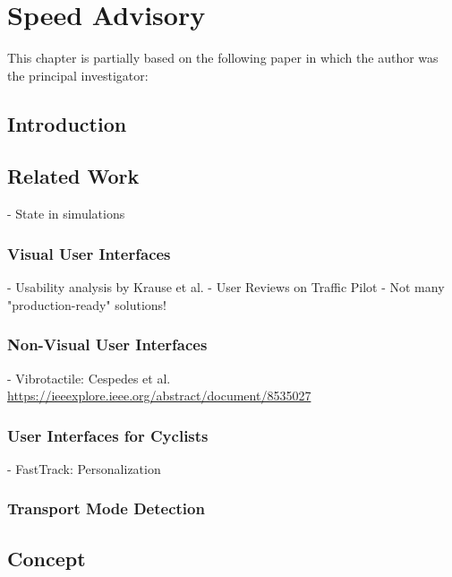 \chapter{Speed Advisory}\label{ch:app}

\begin{Summary}
This chapter is partially based on the following paper in which the author was the principal investigator:

\cite{matthes2022selecting} 
\end{Summary}

\section{Introduction}

\section{Related Work}\label{sec:rw-uis}

- State in simulations

\subsection{Visual User Interfaces}

- Usability analysis by Krause et al.
- User Reviews on Traffic Pilot
- Not many "production-ready" solutions!

\subsection{Non-Visual User Interfaces}

- Vibrotactile: Cespedes et al. \url{https://ieeexplore.ieee.org/abstract/document/8535027}

\subsection{User Interfaces for Cyclists}

- FastTrack: Personalization

\subsection{Transport Mode Detection}

\section{Concept}

